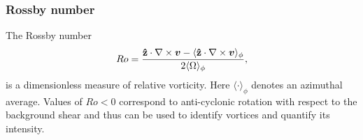 \subsubsection{Rossby number}
The Rossby number
\begin{align}
  Ro = \frac{{\bf \hat{z}} \cdot \nabla \times \bm{v} - \langle
    {\bf\hat{z}} \cdot \nabla \times \bm{v}
    \rangle_{\phi}}{2\langle\Omega\rangle_{\phi}},  
\end{align}
is a dimensionless measure of relative vorticity. 
 Here $\langle \cdot \rangle_{\phi}$ denotes an azimuthal
average. Values of $Ro<0$ correspond to anti-cyclonic rotation with
respect to the background shear and thus can be used to identify
vortices and quantify its intensity. 
